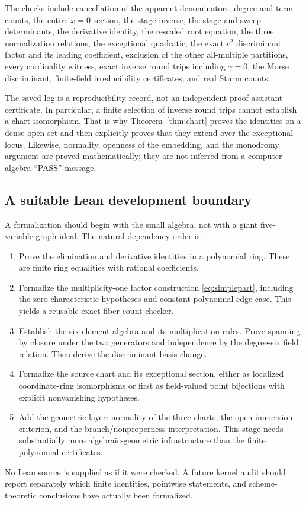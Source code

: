 \documentclass[11pt,a4paper]{article}
\theoremstyle{definition}
\begin{document}
The checks include cancellation of the apparent denominators, degree and
term counts, the entire $x=0$ section, the stage inverse, the stage and
sweep determinants, the derivative identity, the rescaled root equation,
the three normalization relations, the exceptional quadratic, the exact
$c^2$ discriminant factor and its leading coefficient, exclusion of the
other all-multiple partitions, every cardinality witness, exact inverse
round trips including $\gamma=0$, the Morse discriminant, finite-field
irreducibility certificates, and real Sturm counts.

The saved log is a reproducibility record, not an independent proof
assistant certificate. In particular, a finite selection of inverse
round trips cannot establish a chart isomorphism. That is why
Theorem~\ref{thm:chart} proves the identities on a dense open set and
then explicitly proves that they extend over the exceptional locus.
Likewise, normality, openness of the embedding, and the monodromy
argument are proved mathematically; they are not inferred from a
computer-algebra ``PASS'' message.

\subsection{A suitable Lean development boundary}
A formalization should begin with the small algebra, not with a giant
five-variable graph ideal. The natural dependency order is:
\begin{enumerate}[label=\textup{(\arabic*)}]
\item Prove the elimination and derivative identities in a polynomial
ring. These are finite ring equalities with rational coefficients.
\item Formalize the multiplicity-one factor construction
\eqref{eq:simplepart}, including the zero-characteristic hypotheses and
constant-polynomial edge case. This yields a reusable exact fiber-count
checker.
\item Establish the six-element algebra and its multiplication rules.
Prove spanning by closure under the two generators and independence by
the degree-six field relation. Then derive the discriminant basis change.
\item Formalize the source chart and its exceptional section, either as
localized coordinate-ring isomorphisms or first as field-valued point
bijections with explicit nonvanishing hypotheses.
\item Add the geometric layer: normality of the three charts, the open
immersion criterion, and the branch/nonproperness interpretation. This
stage needs substantially more algebraic-geometric infrastructure than
the finite polynomial certificates.
\end{enumerate}
No Lean source is supplied as if it were checked. A future kernel audit
should report separately which finite identities, pointwise statements,
and scheme-theoretic conclusions have actually been formalized.
\end{document}

